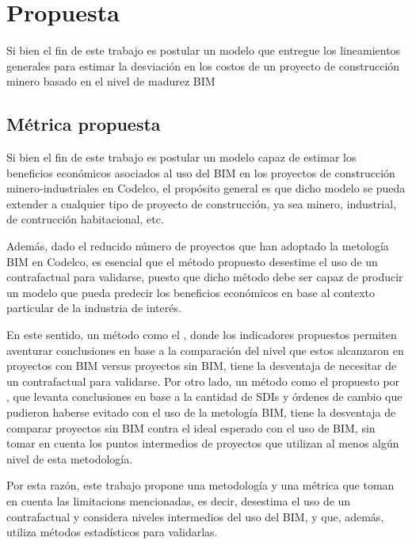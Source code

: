 \chapter{Propuesta}

Si bien el fin de este trabajo es postular un modelo que entregue los lineamientos generales para estimar la desviación en los costos de un proyecto de construcción minero basado en el nivel de madurez BIM 

\section{Métrica propuesta}

Si bien el fin de este trabajo es postular un modelo capaz de estimar los beneficios económicos asociados al uso del BIM en los proyectos de construcción minero-industriales en Codelco, el propósito general es que dicho modelo se pueda extender a cualquier tipo de proyecto de construcción, ya sea minero, industrial, de contrucción habitacional, etc.


Además, dado el reducido número de proyectos que han adoptado la metología BIM en Codelco, es esencial que el método propuesto desestime el uso de un contrafactual para validarse, puesto que dicho método debe ser capaz de producir un modelo que pueda predecir los beneficios económicos en base al contexto particular de la industria de interés.

En este sentido, un método como el , donde los indicadores propuestos permiten aventurar conclusiones en base a la comparación del nivel que estos alcanzaron en proyectos con BIM versus proyectos sin BIM, tiene la desventaja de necesitar de un contrafactual para validarse. Por otro lado, un método como el propuesto por , que levanta conclusiones en base a la cantidad de SDIs y órdenes de cambio que pudieron haberse evitado con el uso de la metología BIM, tiene la desventaja de comparar proyectos sin BIM contra el ideal esperado con el uso de BIM, sin tomar en cuenta los puntos intermedios de proyectos que utilizan al menos algún nivel de esta metodología.

Por esta razón, este trabajo propone una metodología y una métrica que toman en cuenta las limitacions mencionadas, es decir, desestima el uso de un contrafactual y considera niveles intermedios del uso del BIM, y que, además, utiliza métodos estadísticos para validarlas.

